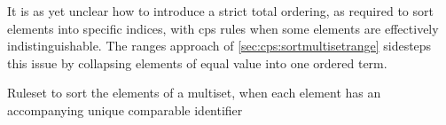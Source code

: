 It is as yet unclear how to introduce a strict total ordering, as required to sort elements into specific indices, with \gls{cps} rules when some elements are effectively indistinguishable.  The ranges approach of \cref{sec:cps:sortmultisetrange} sidesteps this issue by collapsing elements of equal value into one ordered term.


\begin{cprulesetfloat} \begin{cpruleset}


\end{cpruleset}
\caption{\label{rules:cps:sortmultisetid}Ruleset to sort the elements of a multiset, when each element has an accompanying unique comparable identifier}
\end{cprulesetfloat}

